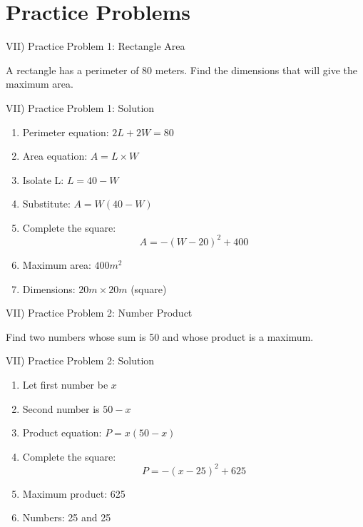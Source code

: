 \documentclass[aspectratio=169]{beamer}
\begin{document}
\section{Practice Problems}

\begin{frame}{VII) Practice Problem 1: Rectangle Area}
    \begin{tcolorbox}[colback=lightgray,colframe=primary,title=Problem]
        \footnotesize
        A rectangle has a perimeter of 80 meters. Find the dimensions that will give the maximum area.
    \end{tcolorbox}
\end{frame}

\begin{frame}{VII) Practice Problem 1: Solution}
    \begin{tcolorbox}[colback=lightgray,colframe=accent,title=Solution]
        \footnotesize
        \begin{enumerate}
            \item Perimeter equation: $2L + 2W = 80$
            \item Area equation: $A = L \times W$
            \item Isolate L: $L = 40 - W$
            \item Substitute: $A = W(40 - W)$
            \item Complete the square:
            \[A = -(W - 20)^2 + 400\]
            \item Maximum area: $400 m^2$
            \item Dimensions: $20m \times 20m$ (square)
        \end{enumerate}
    \end{tcolorbox}
\end{frame}

\begin{frame}{VII) Practice Problem 2: Number Product}
    \begin{tcolorbox}[colback=lightgray,colframe=primary,title=Problem]
        \footnotesize
        Find two numbers whose sum is 50 and whose product is a maximum.
    \end{tcolorbox}
\end{frame}

\begin{frame}{VII) Practice Problem 2: Solution}
    \begin{tcolorbox}[colback=lightgray,colframe=accent,title=Solution]
        \footnotesize
        \begin{enumerate}
            \item Let first number be $x$
            \item Second number is $50 - x$
            \item Product equation: $P = x(50 - x)$
            \item Complete the square:
            \[P = -(x - 25)^2 + 625\]
            \item Maximum product: 625
            \item Numbers: 25 and 25
        \end{enumerate}
    \end{tcolorbox}
\end{frame}
\end{document}

